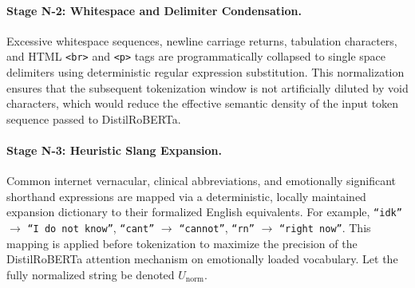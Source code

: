 \documentclass[12pt,twoside]{article}
\begin{document}
\paragraph{Stage N-2: Whitespace and Delimiter Condensation.}
Excessive whitespace sequences, newline carriage returns, tabulation characters, and HTML \texttt{<br>} and \texttt{<p>} tags are programmatically collapsed to single space delimiters using deterministic regular expression substitution. This normalization ensures that the subsequent tokenization window is not artificially diluted by void characters, which would reduce the effective semantic density of the input token sequence passed to DistilRoBERTa.

\paragraph{Stage N-3: Heuristic Slang Expansion.}
Common internet vernacular, clinical abbreviations, and emotionally significant shorthand expressions are mapped via a deterministic, locally maintained expansion dictionary to their formalized English equivalents. For example, \texttt{``idk''} $\rightarrow$ \texttt{``I do not know''}, \texttt{``cant''} $\rightarrow$ \texttt{``cannot''}, \texttt{``rn''} $\rightarrow$ \texttt{``right now''}. This mapping is applied before tokenization to maximize the precision of the DistilRoBERTa attention mechanism on emotionally loaded vocabulary. Let the fully normalized string be denoted $U_{\text{norm}}$.
\end{document}
